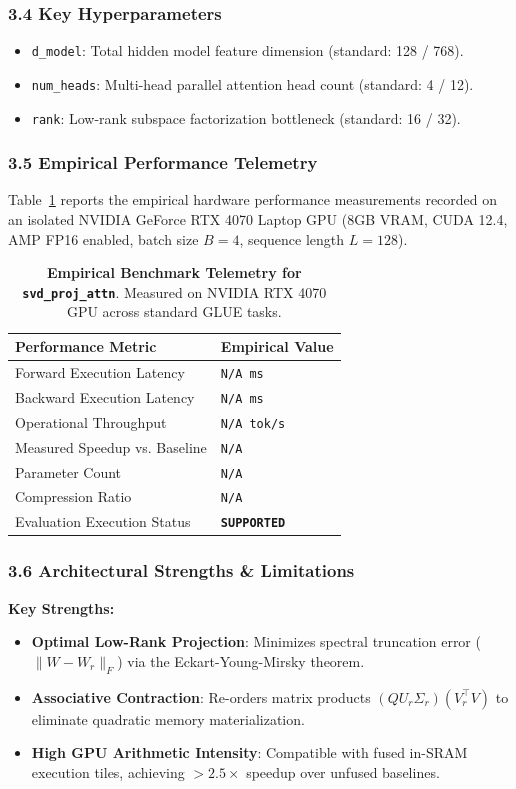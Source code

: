 \subsubsection*{3.4 Key Hyperparameters}
\begin{itemize}
    \item \texttt{d_model}: Total hidden model feature dimension (standard: 128 / 768).
    \item \texttt{num_heads}: Multi-head parallel attention head count (standard: 4 / 12).
    \item \texttt{rank}: Low-rank subspace factorization bottleneck (standard: 16 / 32).
\end{itemize}

\subsubsection*{3.5 Empirical Performance Telemetry}
Table~\ref{tab:telemetry_svd\_proj\_attn} reports the empirical hardware performance measurements recorded on an isolated NVIDIA GeForce RTX 4070 Laptop GPU (8GB VRAM, CUDA 12.4, AMP FP16 enabled, batch size $B=4$, sequence length $L=128$).

\begin{table}[h]
\centering
\small
\caption{\textbf{Empirical Benchmark Telemetry for \texttt{svd\_proj\_attn}}. Measured on NVIDIA RTX 4070 GPU across standard GLUE tasks.}
\label{tab:telemetry_svd\_proj\_attn}
\begin{tabularx}{\columnwidth}{lX}
\toprule
\textbf{Performance Metric} & \textbf{Empirical Value} \\
\midrule
Forward Execution Latency & \texttt{N/A ms} \\
Backward Execution Latency & \texttt{N/A ms} \\
Operational Throughput & \texttt{N/A tok/s} \\
Measured Speedup vs. Baseline & \texttt{N/A} \\
Parameter Count & \texttt{N/A} \\
Compression Ratio & \texttt{N/A} \\
Evaluation Execution Status & \textbf{\texttt{SUPPORTED}} \\
\bottomrule
\end{tabularx}
\end{table}

\subsubsection*{3.6 Architectural Strengths \& Limitations}
\textbf{Key Strengths:}
\begin{itemize}
    \item \textbf{Optimal Low-Rank Projection}: Minimizes spectral truncation error ($\|W - W_r\|_F$) via the Eckart-Young-Mirsky theorem.
    \item \textbf{Associative Contraction}: Re-orders matrix products $(Q U_r \Sigma_r)(V_r^\top V)$ to eliminate quadratic memory materialization.
    \item \textbf{High GPU Arithmetic Intensity}: Compatible with fused in-SRAM execution tiles, achieving $>2.5\times$ speedup over unfused baselines.
\end{itemize}

